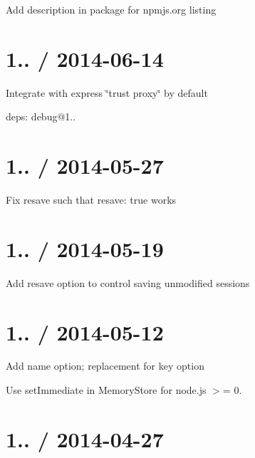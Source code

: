 \begin{DoxyItemize}
\item Add description in package for npmjs.\+org listing
\end{DoxyItemize}

\section*{1.. / 2014-\/06-\/14 }


\begin{DoxyItemize}
\item Integrate with express \char`\"{}trust proxy\char`\"{} by default
\item deps\+: debug@1..
\end{DoxyItemize}

\section*{1.. / 2014-\/05-\/27 }


\begin{DoxyItemize}
\item Fix {\ttfamily resave} such that {\ttfamily resave\+: true} works
\end{DoxyItemize}

\section*{1.. / 2014-\/05-\/19 }


\begin{DoxyItemize}
\item Add {\ttfamily resave} option to control saving unmodified sessions
\end{DoxyItemize}

\section*{1.. / 2014-\/05-\/12 }


\begin{DoxyItemize}
\item Add {\ttfamily name} option; replacement for {\ttfamily key} option
\item Use {\ttfamily set\+Immediate} in Memory\+Store for node.\+js $>$= 0.
\end{DoxyItemize}

\section*{1.. / 2014-\/04-\/27 }


